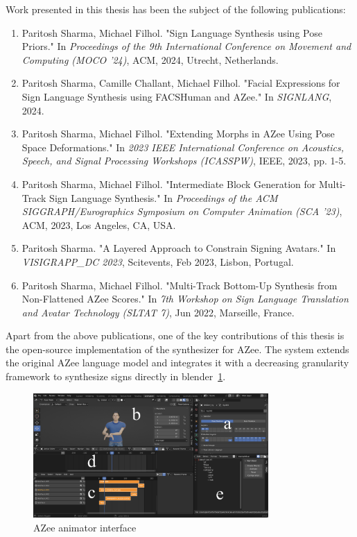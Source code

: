 \documentclass[../../main.tex]{subfiles}
\begin{document}
Work presented in this thesis has been the subject of the following publications:

\begin{enumerate}
    \item Paritosh Sharma, Michael Filhol. "Sign Language Synthesis using Pose Priors." In \textit{Proceedings of the 9th International Conference on Movement and Computing (MOCO '24)}, ACM, 2024, Utrecht, Netherlands.
    
    \item Paritosh Sharma, Camille Challant, Michael Filhol. "Facial Expressions for Sign Language Synthesis using FACSHuman and AZee." In \textit{SIGNLANG}, 2024.
    
    \item Paritosh Sharma, Michael Filhol. "Extending Morphs in AZee Using Pose Space Deformations." In \textit{2023 IEEE International Conference on Acoustics, Speech, and Signal Processing Workshops (ICASSPW)}, IEEE, 2023, pp. 1-5.
    
    \item Paritosh Sharma, Michael Filhol. "Intermediate Block Generation for Multi-Track Sign Language Synthesis." In \textit{Proceedings of the ACM SIGGRAPH/Eurographics Symposium on Computer Animation (SCA '23)}, ACM, 2023, Los Angeles, CA, USA.
    
    \item Paritosh Sharma. "A Layered Approach to Constrain Signing Avatars." In \textit{VISIGRAPP\_DC 2023}, Scitevents, Feb 2023, Lisbon, Portugal.
    
    \item Paritosh Sharma, Michael Filhol. "Multi-Track Bottom-Up Synthesis from Non-Flattened AZee Scores." In \textit{7th Workshop on Sign Language Translation and Avatar Technology (SLTAT 7)}, Jun 2022, Marseille, France.
\end{enumerate}

Apart from the above publications, one of the key contributions of this thesis is the open-source implementation of the synthesizer for AZee. The system extends the original AZee language model and integrates it with a decreasing granularity framework to synthesize signs directly in blender~\ref{fig:conclusion:azee_animator_interface}.

\begin{figure}[ht]
    \centering
    \includegraphics[width=0.8\textwidth]{chapters/conclusion/images/blender-interface.png}
    \caption{AZee animator interface}
    \label{fig:conclusion:azee_animator_interface}
\end{figure}
\end{document}
